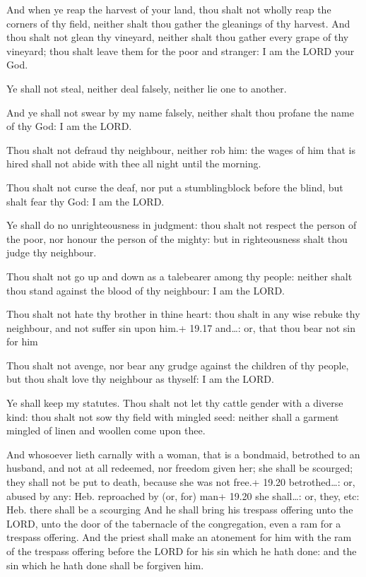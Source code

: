  And when ye reap the harvest of your land, thou shalt not
wholly reap the corners of thy field, neither shalt thou gather the
gleanings of thy harvest.  And thou shalt not glean thy
vineyard, neither shalt thou gather every grape of thy vineyard; thou
shalt leave them for the poor and stranger: I am the LORD your God.

 Ye shall not steal, neither deal falsely, neither lie
one to another.

 And ye shall not swear by my name falsely, neither shalt
thou profane the name of thy God: I am the LORD.

 Thou shalt not defraud thy neighbour, neither rob him:
the wages of him that is hired shall not abide with thee all night until
the morning.

 Thou shalt not curse the deaf, nor put a stumblingblock
before the blind, but shalt fear thy God: I am the LORD.

 Ye shall do no unrighteousness in judgment: thou shalt
not respect the person of the poor, nor honour the person of the mighty:
but in righteousness shalt thou judge thy neighbour.

 Thou shalt not go up and down as a talebearer among thy
people: neither shalt thou stand against the blood of thy neighbour: I
am the LORD.

 Thou shalt not hate thy brother in thine heart: thou
shalt in any wise rebuke thy neighbour, and not suffer sin upon him.+
19.17 and\ldots: or, that thou bear not sin for him

 Thou shalt not avenge, nor bear any grudge against the
children of thy people, but thou shalt love thy neighbour as thyself: I
am the LORD.

 Ye shall keep my statutes. Thou shalt not let thy cattle
gender with a diverse kind: thou shalt not sow thy field with mingled
seed: neither shall a garment mingled of linen and woollen come upon
thee.

 And whosoever lieth carnally with a woman, that is a
bondmaid, betrothed to an husband, and not at all redeemed, nor freedom
given her; she shall be scourged; they shall not be put to death,
because she was not free.+ 19.20 betrothed\ldots: or, abused by any:
Heb. reproached by (or, for) man+ 19.20 she shall\ldots: or, they, etc:
Heb. there shall be a scourging  And he shall bring his
trespass offering unto the LORD, unto the door of the tabernacle of the
congregation, even a ram for a trespass offering.  And the
priest shall make an atonement for him with the ram of the trespass
offering before the LORD for his sin which he hath done: and the sin
which he hath done shall be forgiven him.

